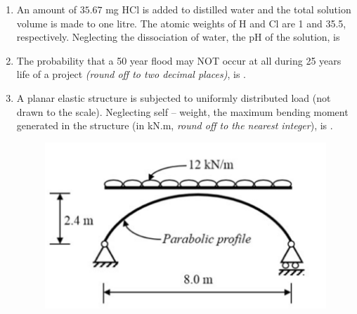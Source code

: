 \documentclass[journal]{IEEEtran}
\begin{document}
\begin{enumerate}
\begin{enumerate}
\end{enumerate}

\item An amount of $35.67$ mg HCl is added to distilled water and the total solution volume is made to one litre. The atomic weights of H and Cl are 1 and 35.5, respectively. Neglecting the dissociation of water, the pH of the solution, is  \hfill {}

\begin{enumerate}
\end{enumerate}

\item The probability that a 50 year flood may NOT occur at all during 25 years life of a project \emph{(round off to two decimal places)}, is \underline{\hspace{2cm}}.  \hfill {}

\item A planar elastic structure is subjected to uniformly distributed load (not drawn to the scale). Neglecting self -- weight, the maximum bending moment generated in the structure (in kN.m, \emph{round off to the nearest integer}), is \underline{\hspace{2cm}}.  \hfill {}

\begin{figure}[H]
    \centering
    \includegraphics[width=0.3\columnwidth]{figs/Q29.png} 
    \caption{}
    \label{fig:placeholder}
\end{figure}


\end{enumerate}
\end{document}
